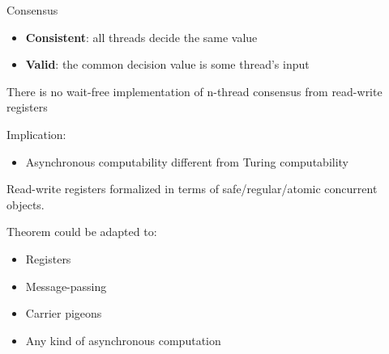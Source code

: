 \begin{frame}{Consensus}

\begin{itemize}
  \item \textbf{Consistent}: all threads decide the same value
  \item \textbf{Valid}: the common decision value is some thread's input
\end{itemize}

\pause

\begin{theorem}
  There is no wait-free implementation of n-thread consensus from read-write registers
\end{theorem}

\pause

Implication:
\begin{itemize}
  \item Asynchronous computability different from Turing computability
\end{itemize}

\pause

Read-write registers formalized in terms of safe/regular/atomic concurrent objects.

\pause

Theorem could be adapted to:

\begin{itemize}
  \item Registers
  \item Message-passing
  \item Carrier pigeons
  \item Any kind of asynchronous computation
\end{itemize}

\end{frame}

